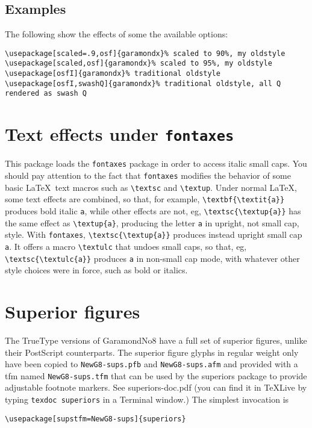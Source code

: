 \documentclass[11pt]{article}
\begin{document}
\subsection{Examples} The following show the effects of some the available options:

\begin{verbatim}
\usepackage[scaled=.9,osf]{garamondx}% scaled to 90%, my oldstyle
\usepackage[scaled,osf]{garamondx}% scaled to 95%, my oldstyle
\usepackage[osfI]{garamondx}% traditional oldstyle
\usepackage[osfI,swashQ]{garamondx}% traditional oldstyle, all Q rendered as swash Q
\end{verbatim}
\section{Text effects under \texttt{fontaxes}}
This package loads the {\tt fontaxes} package in order to access italic small caps. You should pay attention to the fact that {\tt fontaxes} modifies the behavior of some basic \LaTeX\ text macros such as \verb|\textsc| and \verb|\textup|. Under normal \LaTeX, some text effects are combined, so that, for example, \verb|\textbf{\textit{a}}| produces bold italic {\tt a}, while other effects are not, eg, \verb|\textsc{\textup{a}}| has the same effect as \verb|\textup{a}|, producing the letter {\tt a} in upright, not small cap, style. With {\tt fontaxes}, \verb|\textsc{\textup{a}}| produces instead upright small cap {\tt a}. It offers a macro \verb|\textulc| that undoes small caps, so that, eg, \verb|\textsc{\textulc{a}}| produces {\tt a} in non-small cap mode, with whatever other style choices were in force, such as bold or italics.

\section{Superior figures}
The TrueType versions of GaramondNo8 have a full set of superior figures, unlike their PostScript counterparts. The superior figure glyphs in regular weight only have been copied to \texttt{NewG8-sups.pfb} and \texttt{NewG8-sups.afm} and provided with a tfm named \texttt{NewG8-sups.tfm} that can be used by the \textsf{superiors} package to provide adjustable footnote markers. See \textsf{superiors-doc.pdf} (you can find it in \TeX Live by typing \texttt{texdoc superiors} in a Terminal window.) The simplest invocation is
\begin{verbatim}
\usepackage[supstfm=NewG8-sups]{superiors}
\end{verbatim}
\end{document}

